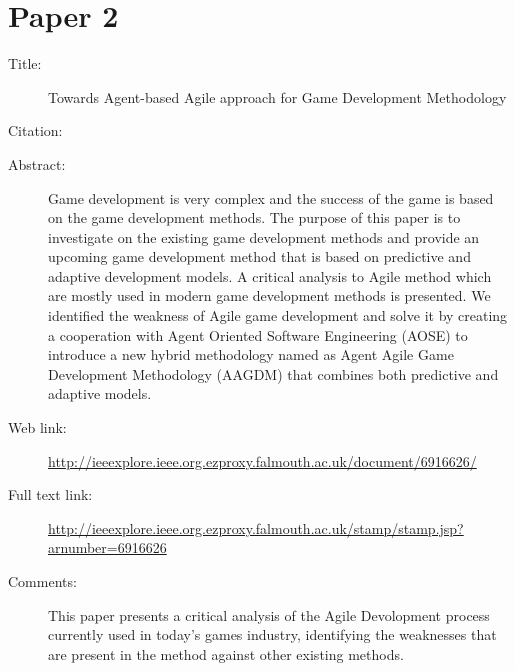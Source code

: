 \documentclass{scrartcl}
\begin{document}
\section*{Paper 2}
\begin{description}
\item[Title:] Towards Agent-based Agile approach for Game Development Methodology
\item[Citation:] \cite{bibtex_key}
\item[Abstract:] Game development is very complex and the success of the game is based on the game development methods. The purpose of this paper is to investigate on the existing game development methods and provide an upcoming game development method that is based on predictive and adaptive development models. A critical analysis to Agile method which are mostly used in modern game development methods is presented. We identified the weakness of Agile game development and solve it by creating a cooperation with Agent Oriented Software Engineering (AOSE) to introduce a new hybrid methodology named as Agent Agile Game Development Methodology (AAGDM) that combines both predictive and adaptive models.
\item[Web link:] \url{http://ieeexplore.ieee.org.ezproxy.falmouth.ac.uk/document/6916626/}
\item[Full text link:] \url{http://ieeexplore.ieee.org.ezproxy.falmouth.ac.uk/stamp/stamp.jsp?arnumber=6916626}
\item[Comments:] This paper presents a critical analysis of the Agile Devolopment process currently used in today's games industry, identifying the weaknesses that are present in the method against other existing methods.
\end{description}
\end{document}
